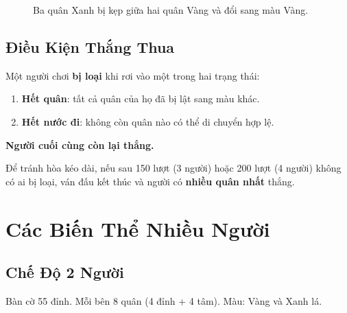 \documentclass[12pt, a4paper]{article}
\begin{document}
\begin{figure}[H]
  \centering
  \caption{Ba quân Xanh bị kẹp giữa hai quân Vàng và đổi sang màu Vàng.}
  \label{fig:sandwich}
\end{figure}

\subsection{Điều Kiện Thắng Thua}

Một người chơi \textbf{bị loại} khi rơi vào một trong hai trạng thái:
\begin{enumerate}
  \item \textbf{Hết quân}: tất cả quân của họ đã bị lật sang màu khác.
  \item \textbf{Hết nước đi}: không còn quân nào có thể di chuyển hợp lệ.
\end{enumerate}
\textbf{Người cuối cùng còn lại thắng.}

Để tránh hòa kéo dài, nếu sau 150 lượt (3 người) hoặc 200 lượt (4 người)
không có ai bị loại, ván đấu kết thúc và người có \textbf{nhiều quân nhất}
thắng.

\section{Các Biến Thể Nhiều Người}
\label{sec:variants}

\subsection{Chế Độ 2 Người}
Bàn cờ 5{\texttimes}5 đỉnh. Mỗi bên 8 quân (4 đỉnh + 4 tâm).
Màu: Vàng và Xanh lá.
\end{document}

